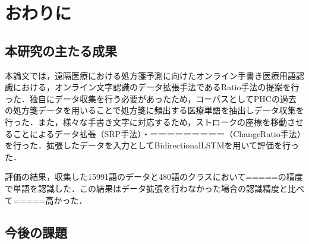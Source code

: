 
\chapter{おわりに}
\label{cha:conclu}

\section{本研究の主たる成果}
\label{sec:main-result}

本論文では，遠隔医療における処方箋予測に向けたオンライン手書き医療用語認識における，オンライン文字認識のデータ拡張手法であるRatio手法の提案を行った．独自にデータ収集を行う必要があったため，コーパスとしてPHCの過去の処方箋データを用いることで処方箋に頻出する医療単語を抽出しデータ収集を行った．また，様々な手書き文字に対応するため，ストロークの座標を移動させることによるデータ拡張（SRP手法）・ーーーーーーーーー（ChangeRatio手法）を行った．拡張したデータを入力としてBidirectionalLSTMを用いて評価を行った．

評価の結果，収集した15991語のデータと480語のクラスにおいて=====の精度で単語を認識した．この結果はデータ拡張を行わなかった場合の認識精度と比べて=====高かった．
\section{今後の課題}
\label{sec:future}

